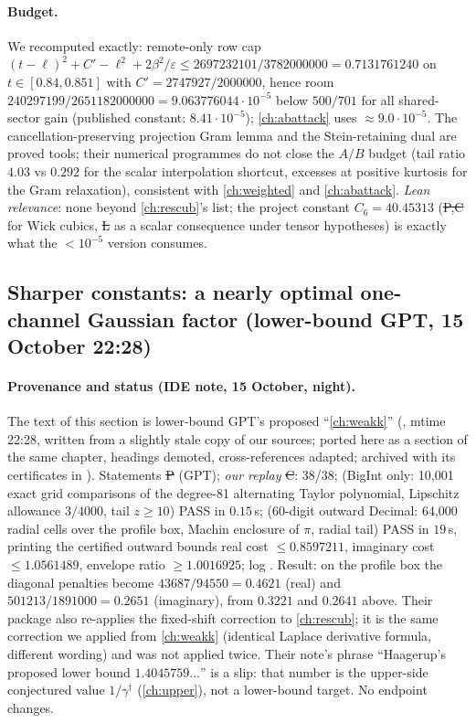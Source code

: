 \paragraph{Budget.} We recomputed exactly: remote-only row cap $(t-\ell)^2+C'-\ell^2+2\beta^2/\varepsilon\le2697232101/3782000000=0.7131761240$ on $t\in[0.84,0.851]$ with $C'=2747927/2000000$, hence room
$240297199/2651182000000=9.063776044\cdot10^{-5}$ below $500/701$ for all shared-sector gain (published constant: $8.41\cdot10^{-5}$); \autoref{ch:abattack} uses $\approx9.0\cdot10^{-5}$. The
cancellation-preserving projection Gram lemma and the Stein-retaining dual are proved tools; their numerical programmes do not close the $A/B$ budget (tail ratio $4.03$ vs $0.292$ for the
scalar interpolation shortcut, excesses at positive kurtosis for the Gram relaxation), consistent with \autoref{ch:weighted} and \autoref{ch:abattack}. \emph{Lean relevance}: none beyond
\autoref{ch:rescub}'s list; the project constant $C_6=40.45313$ (\st{P,C} for Wick cubics, \st{L} as a scalar consequence under tensor hypotheses) is exactly what the $<10^{-5}$ version consumes.

\subsection{Sharper constants: a nearly optimal one-channel Gaussian factor (lower-bound GPT, 15 October 22:28)}\label{sec:gaussian-sharpening}
\paragraph{Provenance and status (IDE note, 15 October, night).} The text of this section is lower-bound GPT's proposed ``\autoref{ch:weakk}'' (, mtime 22:28,
written from a slightly stale copy of our sources; ported here as a section of the same chapter, headings demoted, cross-references adapted; archived with its certificates in
). Statements \st{P} (GPT); \emph{our replay} \st{C}:  38/38;  (BigInt only: 10,001 exact grid comparisons of the degree-81 alternating Taylor polynomial, Lipschitz allowance $3/4000$, tail $z\ge10$) PASS in $0.15$\,s;
 (60-digit outward Decimal: 64,000 radial cells over the profile box, Machin enclosure of $\pi$, radial tail) PASS in $19$\,s, printing the
certified outward bounds real cost $\le0.8597211$, imaginary cost $\le1.0561489$, envelope ratio $\ge1.0016925$; log . Result: on the
profile box the diagonal penalties become $43687/94550=0.4621$ (real) and $501213/1891000=0.2651$ (imaginary), from $0.3221$ and $0.2641$ above. Their package also re-applies the fixed-shift
correction to \autoref{ch:rescub}; it is the same correction we applied from \autoref{ch:weakk} (identical Laplace derivative formula, different wording) and was not applied twice. Their
note's phrase ``Haagerup's proposed lower bound $1.4045759\ldots$'' is a slip: that number is the upper-side conjectured value $1/\gamma^\dagger$ (\autoref{ch:upper}), not a lower-bound target. No
endpoint changes.


